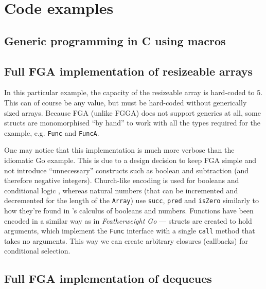 \section{Code examples}

\subsection{Generic programming in C using macros}
\label{sec:generic-c}




\subsection{Full FGA implementation of resizeable arrays}
\label{sec:fg-resizable-array-code}

In this particular example, the capacity of the resizeable array is hard-coded
to 5. This can of course be any value, but must be hard-coded without
generically sized arrays. Because FGA (unlike FGGA) does not support generics at
all, some structs are monomorphised ``by hand'' to work with all the types
required for the example, e.g. \texttt{Func} and \texttt{FuncA}.

One may notice that this implementation is much more verbose than the idiomatic
Go example. This is due to a design decision to keep FGA simple and not
introduce ``unnecessary'' constructs such as boolean and subtraction (and
therefore negative integers). Church-like encoding is used for booleans and
conditional logic \autocite{lambdaCalculus}, whereas natural numbers (that can
be incremented and decremented for the length of the \texttt{Array}) use
\texttt{succ}, \texttt{pred} and \texttt{isZero} similarly to how they're found
in \textcite{tapl}'s calculus of booleans and numbers. Functions have been
encoded in a similar way as in \emph{Featherweight Go} \autocite{fg} --- structs
are created to hold arguments, which implement the \texttt{Func} interface with
a single \texttt{call} method that takes no arguments. This way we can create
arbitrary closures (callbacks) for conditional selection.

\clearpage


\subsection{Full FGA implementation of dequeues}
\label{sec:fg-deque-code}


